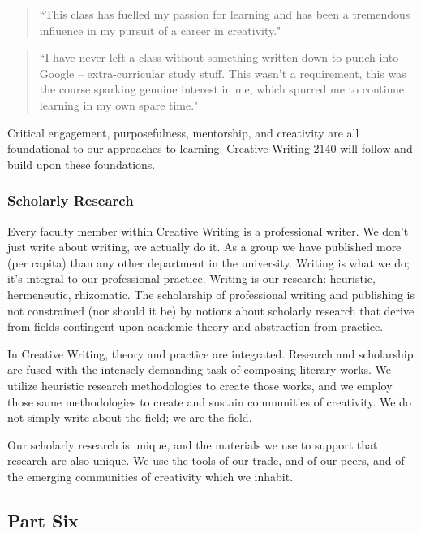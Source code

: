 \documentclass[letterpaper,10pt,headsepline]{scrreprt}
\begin{document}
\begin{quotation}
``This class has fuelled my passion for learning and has been a tremendous influence in my pursuit of a career in creativity."
\end{quotation}

\begin{quotation}
``I have never left a class without something written down to punch into Google -- extra-curricular study stuff. This wasn't a requirement, this was the course sparking genuine interest in me, which spurred me to continue learning in my own spare time."
\end{quotation}

Critical engagement, purposefulness, mentorship, and creativity are all foundational to our approaches to learning. Creative Writing 2140 will follow and build upon these foundations.

\subsubsection{Scholarly Research}

Every faculty member within Creative Writing is a professional writer. We don't just write about writing, we actually do it. As a group we have published more (per capita) than any other department in the university. Writing is what we do; it's integral to our professional practice. Writing is our research: heuristic, hermeneutic, rhizomatic. The scholarship of professional writing and publishing is not constrained (nor should it be) by notions about scholarly research that derive from fields contingent upon academic theory and abstraction from practice. 

In Creative Writing, theory and practice are integrated. Research and scholarship are fused with the intensely demanding task of composing literary works. We utilize heuristic research methodologies to create those works, and we employ those same methodologies to create and sustain communities of creativity. We do not simply write about the field; we are the field.

Our scholarly research is unique, and the materials we use to support that research are also unique. We use the tools of our trade, and of our peers, and of the emerging communities of creativity which we inhabit. 

\subsection{Part Six}
\end{document}
